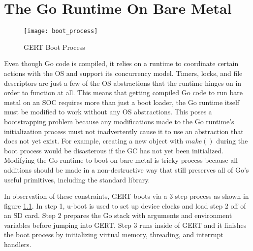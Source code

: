 \chapter{The Go Runtime On Bare Metal}

\begin{figure}[h]
\begin{center}
  \texttt{[image: boot\_process]}
\end{center}
  \caption{GERT Boot Process} \label{fig:boot}
\end{figure}

Even though Go code is compiled, it relies on a runtime to coordinate certain actions with the OS and support its concurrency model.
Timers, locks, and file descriptors are just a few of the OS abstractions that the runtime hinges on
in order to function at all. This means that getting compiled Go code to run bare metal on an SOC requires
more than just a boot loader, the Go runtime itself must be modified to work without any OS abstractions.
This poses a bootstrapping problem because any modifications made to the Go runtime's initialization
process must not inadvertently cause it to use an abstraction that does not yet exist. For example,
creating a new object with $make()$ during the boot process would be disasterous if the GC has not yet been initialized.
Modifying the Go runtime to boot on bare metal is tricky process because all additions should be made
in a non-destructive way that still preserves all of Go's useful primitives, including the standard library.


In observation of these constraints, GERT boots via a 3-step process as shown in  figure \ref{fig:boot}.
In step 1, u-boot is used to set up device clocks and load step 2 off of an SD card. Step 2 prepares the
Go stack with arguments and environment variables before jumping into GERT. Step 3 runs inside of GERT and it
finishes the boot process by initializing virtual memory, threading, and interrupt handlers.







